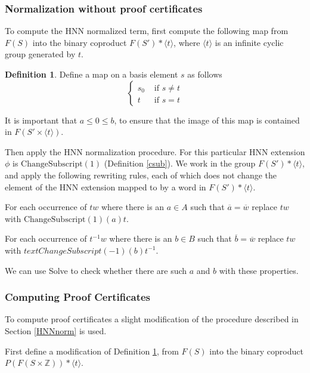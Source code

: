 \documentclass[12pt]{article} %
\theoremstyle{definition}
\theoremstyle{definition}
\theoremstyle{definition}
\theoremstyle{definition}
\theoremstyle{definition}
\newtheorem{defn}[theorem]{Definition}
\theoremstyle{definition}
\begin{document}
\subsubsection{Normalization without proof certificates}\label{HNNnormnoproof}

To compute the HNN normalized term,
first compute the following map from $F(S)$ into the binary
coproduct $F(S') \ast \langle t \rangle$, where $\langle t \rangle$ is an infinite
cyclic group generated by $t$.

\begin{defn}\label{tocoprod}
  Define a map on a basis element $s$ as follows
  \begin{equation}
    \begin{cases}
      s_0 & \text{ if } s \ne t \\
      t & \text{ if } s = t
    \end{cases}
  \end{equation}
\end{defn}

It is important that $a \le 0 \le b$, to ensure that the image
of this map is contained in $F(S' \times \langle t \rangle)$.

Then apply the HNN normalization procedure. For this particular HNN extension
$\phi$ is $\text{ChangeSubscript}(1)$ (Definition \ref{csub}).
We work in the group $F(S') \ast \langle t \rangle$, and apply the following
rewriting rules, each of which does not change the element of the HNN extension
mapped to by a word in $F(S') \ast \langle t \rangle$.

For each occurrence of $tw$ where there is an $a \in A$ such that
$\overline{a} = \overline{w}$ replace $tw$ with $\text{ChangeSubscript}(1)(a)t$.

For each occurrence of $t^{-1}w$ where there is an $b \in B$ such that
$\overline{b} = \overline{w}$ replace $tw$ with $text{ChangeSubscript}(-1)(b)t^{-1}$.

We can use Solve to check whether there are such $a$ and $b$ with
these properties.

\subsubsection{Computing Proof Certificates}\label{HNNPC}

To compute proof certificates a slight modification of the procedure described in Section
\ref{HNNnorm} is used.

First define a modification of Definition \ref{tocoprod}, from $F(S)$ into the binary
coproduct $P(F(S \times \mathbb{Z})) \ast \langle t \rangle$.
\end{document}
